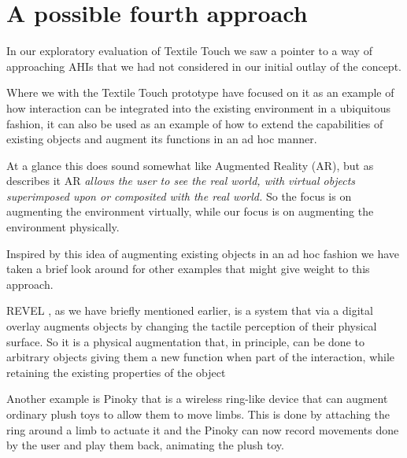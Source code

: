 \section{A possible fourth approach}
In our exploratory evaluation of Textile Touch we saw a pointer to a way of approaching AHIs that we had not considered in our initial outlay of the concept.


Where we with the Textile Touch prototype have focused on it as an example of how interaction can be integrated into the existing environment in a ubiquitous fashion, it can also be used as an example of how to extend the capabilities of existing objects and augment its functions in an ad hoc manner.

At a glance this does sound somewhat like Augmented Reality (AR), but as \citet{azuma1997survey} describes it AR \emph{allows the user to see the real world, with virtual objects superimposed upon or composited with the real world.}
So the focus is on augmenting the environment virtually, while our focus is on augmenting the environment physically.


Inspired by this idea of augmenting existing objects in an ad hoc fashion we have taken a brief look around for other examples that might give weight to this approach.

REVEL \citep{bau2013revel}, as we have briefly mentioned earlier, is a system that via a digital overlay augments objects by changing the tactile perception of their physical surface.
So it is a physical augmentation that, in principle, can be done to arbitrary objects giving them a new function when part of the interaction, while retaining the existing properties of the object 

Another example is Pinoky \citep{sugiura2012pinoky} that is a wireless ring-like device that can augment ordinary plush toys to allow them to move limbs.
This is done by attaching the ring around a limb to actuate it and the Pinoky can now record movements done by the user and play them back, animating the plush toy.
